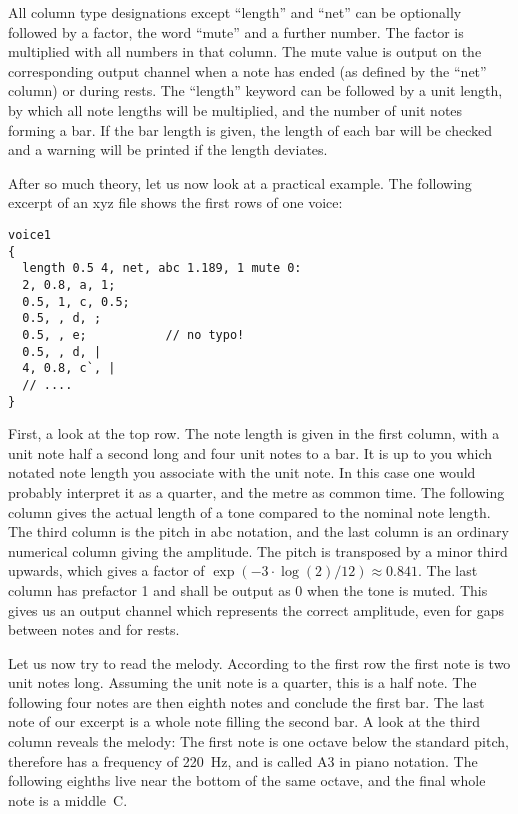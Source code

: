 \documentclass{article}
\def\bv{\begin{verbatim}}
\begin{document}
All column type designations except ``length'' and ``net'' can be optionally
followed by a factor, the word ``mute'' and a further number.  The factor is
multiplied with all numbers in that column.  The mute value is output on the
corresponding output channel when a note has ended (as defined by the ``net''
column) or during rests.  The ``length'' keyword can be followed by a unit
length, by which all note lengths will be multiplied, and the number of unit
notes forming a bar.  If the bar length is given, the length of each bar will
be checked and a warning will be printed if the length deviates.

After so much theory, let us now look at a practical example.  The following
excerpt of an xyz file shows the first rows of one voice:

\bv
voice1
{
  length 0.5 4, net, abc 1.189, 1 mute 0:
  2, 0.8, a, 1;
  0.5, 1, c, 0.5;
  0.5, , d, ;
  0.5, , e;           // no typo!
  0.5, , d, |
  4, 0.8, c`, |
  // ....
}
\end{verbatim}

First, a look at the top row.  The note length is given in the first column,
with a unit note half a second long and four unit notes to a bar.  It is up to
you which notated note length you associate with the unit note.  In this case
one would probably interpret it as a quarter, and the metre as common time.
The following column gives the actual length of a tone compared to the nominal
note length.  The third column is the pitch in abc notation, and the last
column is an ordinary numerical column giving the amplitude.  The pitch is
transposed by a minor third upwards, which gives a factor of
$\exp(-3\cdot \log(2)/12)\approx 0.841$.  The last column has prefactor 1 and
shall be output as 0 when the tone is muted.  This gives us an output channel
which represents the correct amplitude, even for gaps between notes and for
rests.

Let us now try to read the melody.  According to the first row the first note
is two unit notes long.  Assuming the unit note is a quarter, this is a half
note.  The following four notes are then eighth notes and conclude the first
bar.  The last note of our excerpt is a whole note filling the second bar.  A 
look at the third column reveals the melody:  The first note is one octave
below the standard pitch, therefore has a frequency of 220~Hz, and is called
A3 in piano notation.  The following eighths live near the bottom of the same
octave, and the final whole note is a middle~C.
\end{document}
